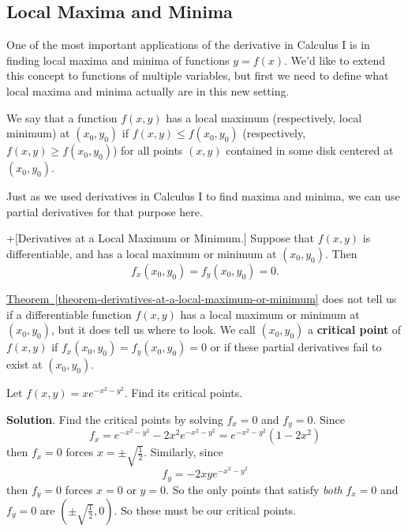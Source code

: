 \documentclass[10pt,]{book}
\newcommand{\terminology}[1]{\textbf{#1}}
\theoremstyle{ptxplainnotitle}
\theoremstyle{ptxplaintitle}
\theoremstyle{ptxplainnotitle}
\theoremstyle{ptxplaintitle}
\theoremstyle{ptxplainnotitle}
\theoremstyle{ptxplaintitle}
\theoremstyle{ptxdefinitionnotitle}
\theoremstyle{ptxdefinitiontitle}
\theoremstyle{ptxdefinitionnotitle}
\theoremstyle{ptxdefinitiontitle}
\theoremstyle{ptxdefinitionnotitle}
\theoremstyle{ptxdefinitiontitle}
\theoremstyle{ptxdefinitionnotitle}
\theoremstyle{ptxdefinitiontitle}
\theoremstyle{ptxdefinitionnotitle}
\theoremstyle{ptxdefinitiontitle}
\numberwithin{equation}{section}
\begin{document}
\subsection[{Local Maxima and Minima}]{Local Maxima and Minima}\label{subsection-local-maxima-and-minima}
\hypertarget{p-1073}{}%
One of the most important applications of the derivative in Calculus I is in finding local maxima and minima of functions \(y = f(x)\). We'd like to extend this concept to functions of multiple variables, but first we need to define what local maxima and minima actually are in this new setting.%
\begin{definition}\label{definition-local-maxima-and-minima}
\hypertarget{p-1074}{}%
We say that a function \(f(x,y)\) has a local maximum (respectively, local minimum) at \((x_{0},y_{0})\) if \(f(x,y)\leq f(x_{0},y_{0})\) (respectively, \(f(x,y)\geq f(x_{0},y_{0})\)) for all points \((x,y)\) contained in some disk centered at \((x_{0},y_{0})\).%
\end{definition}
\hypertarget{p-1075}{}%
Just as we used derivatives in Calculus I to find maxima and minima, we can use partial derivatives for that purpose here.%
\begin{theorem}+[{Derivatives at a Local Maximum or Minimum.}]\label{theorem-derivatives-at-a-local-maximum-or-minimum}
\hypertarget{p-1076}{}%
Suppose that \(f(x,y)\) is differentiable, and has a local maximum or minimum at \((x_{0},y_{0})\). Then%
\begin{equation*}
f_{x}(x_{0},y_{0}) = f_{y}(x_{0},y_{0}) = 0.
\end{equation*}
%
\end{theorem}
\hypertarget{p-1077}{}%
\hyperref[theorem-derivatives-at-a-local-maximum-or-minimum]{Theorem~\ref{theorem-derivatives-at-a-local-maximum-or-minimum}} does not tell us if a differentiable function \(f(x,y)\) has a local maximum or minimum at \((x_{0},y_{0})\), but it does tell us where to look. We call \((x_{0},y_{0})\) a \terminology{critical point} of \(f(x,y)\) if \(f_{x}(x_{0},y_{0}) = f_{y}(x_{0},y_{0}) = 0\) or if these partial derivatives fail to exist at \((x_{0},y_{0})\).%
\begin{example}\label{example-critical-points-of-an-exponential}
\hypertarget{p-1078}{}%
Let \(f(x,y) = xe^{-x^{2} - y^{2}}\). Find its critical points.%
\par\smallskip%
\noindent\textbf{Solution}.\hypertarget{solution-169}{}\quad%
\hypertarget{p-1079}{}%
Find the critical points by solving \(f_{x} = 0\) and \(f_{y} = 0\). Since%
\begin{equation*}
f_{x} = e^{-x^{2} - y^{2}} -2x^{2}e^{-x^{2} - y^{2}} = e^{-x^{2} - y^{2}}(1 - 2x^{2})
\end{equation*}
then \(f_{x} = 0\) forces \(x = \pm\sqrt{\frac{1}{2}}\). Similarly, since%
\begin{equation*}
f_{y} = -2xye^{-x^{2} - y^{2}}
\end{equation*}
then \(f_{y} = 0\) forces \(x = 0\) or \(y = 0\). So the only points that satisfy \emph{both} \(f_{x} = 0\) and \(f_{y} = 0\) are \((\pm\sqrt{\frac{1}{2}}, 0).\) So these must be our critical points.%
\end{example}
\end{document}
